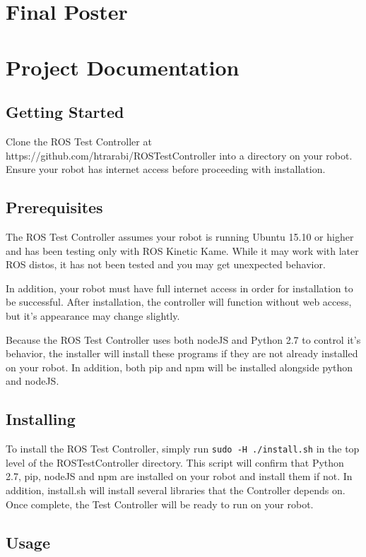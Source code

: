 \documentclass[onecolumn, draftclsnofoot,10pt, compsoc]{report}
\begin{document}
\chapter{Final Poster}
\minitoc

\chapter{Project Documentation}

\minitoc
\section{Getting Started}


Clone the ROS Test Controller at https://github.com/htrarabi/ROSTestController into a directory on your robot. Ensure your robot has internet access before proceeding with installation.

\section{Prerequisites}

The ROS Test Controller assumes your robot is running Ubuntu 15.10 or higher and has been testing only with ROS Kinetic Kame. While it may work with later ROS distos, it has not been tested and you may get unexpected behavior.

In addition, your robot must have full internet access in order for installation to be successful. After installation, the controller will function without web access, but it's appearance may change slightly.

Because the ROS Test Controller uses both nodeJS and Python 2.7 to control it's behavior, the installer will install these programs if they are not already installed on your robot. In addition, both pip and npm will be installed alongside python and nodeJS.
\section{Installing}

To install the ROS Test Controller, simply run \texttt{sudo -H ./install.sh} in the top level of the ROSTestController directory. This script will confirm that Python 2.7, pip, nodeJS and npm are installed on your robot and install them if not. In addition, install.sh will install several libraries that the Controller depends on. Once complete, the Test Controller will be ready to run on your robot.
\section{Usage}
\end{document}

